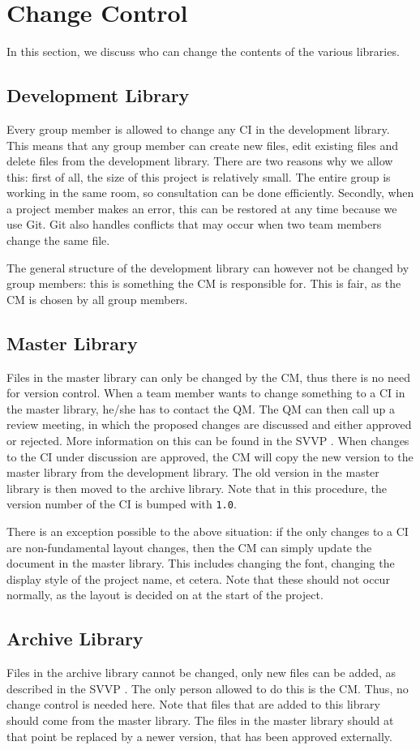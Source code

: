 \section{Change Control}
In this section, we discuss who can change the contents of the various libraries.

\subsection{Development Library}
Every group member is allowed to change any CI in the development library. This means that any group member can create new files, edit existing files and delete files from the development library. There are two reasons why we allow this: first of all, the size of this project is relatively small. The entire group is working in the same room, so consultation can be done efficiently. Secondly, when a project member makes an error, this can be restored at any time because we use Git. Git also handles conflicts that may occur when two team members change the same file.

The general structure of the development library can however not be changed by group members: this is something the CM is responsible for. This is fair, as the CM is chosen by all group members.

\subsection{Master Library}
Files in the master library can only be changed by the CM, thus there is no need for version control. When a team member wants to change something to a CI in the master library, he/she has to contact the QM. The QM can then call up a review meeting, in which the proposed changes are discussed and either approved or rejected. More information on this can be found in the SVVP \cite{svvp}. When changes to the CI under discussion are approved, the CM will copy the new version to the master library from the development library. The old version in the master library is then moved to the archive library. Note that in this procedure, the version number of the CI is bumped with \texttt{1.0}.

There is an exception possible to the above situation: if the only changes to a CI are non-fundamental layout changes, then the CM can simply update the document in the master library. This includes changing the font, changing the display style of the project name, et cetera. Note that these should not occur normally, as the layout is decided on at the start of the project.

\subsection{Archive Library}
Files in the archive library cannot be changed, only new files can be added, as described in the SVVP \cite{svvp}. The only person allowed to do this is the CM. Thus, no change control is needed here. Note that files that are added to this library should come from the master library. The files in the master library should at that point be replaced by a newer version, that has been approved externally.